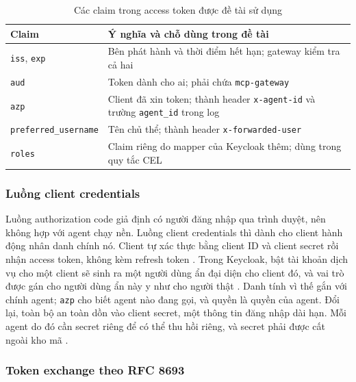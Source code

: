 \documentclass[a4paper]{article}
\begin{document}
\begin{table}[H]\centering\caption{Các claim trong access token được đề tài sử dụng}\label{tab:ch3-claims}
{\singlespacing\renewcommand{\arraystretch}{1.2}\small
\begin{tabularx}{\textwidth}{|p{3.3cm}|X|}\hline
\textbf{Claim} & \textbf{Ý nghĩa và chỗ dùng trong đề tài} \\ \hline
\texttt{iss}, \texttt{exp} & Bên phát hành và thời điểm hết hạn; gateway kiểm tra cả hai \\ \hline
\texttt{aud} & Token dành cho ai; phải chứa \texttt{mcp-gateway} \\ \hline
\texttt{azp} & Client đã xin token; thành header \texttt{x-agent-id} và trường \texttt{agent\_id} trong log \\ \hline
\texttt{preferred\_\allowbreak username} & Tên chủ thể; thành header \texttt{x-forwarded-user} \\ \hline
\texttt{roles} & Claim riêng do mapper của Keycloak thêm; dùng trong quy tắc CEL \\ \hline
\end{tabularx}}\end{table}

\subsubsection{Luồng client credentials}

Luồng authorization code giả định có người đăng nhập qua trình duyệt, nên không hợp với agent chạy nền. Luồng client credentials thì dành cho client hành động nhân danh chính nó. Client tự xác thực bằng client ID và client secret rồi nhận access token, không kèm refresh token \parencite{rfc6749}. Trong Keycloak, bật tài khoản dịch vụ cho một client sẽ sinh ra một người dùng ẩn đại diện cho client đó, và vai trò được gán cho người dùng ẩn này y như cho người thật \parencite{keycloak}. Danh tính vì thế gắn với chính agent; \texttt{azp} cho biết agent nào đang gọi, và quyền là quyền của agent. Đổi lại, toàn bộ an toàn dồn vào client secret, một thông tin đăng nhập dài hạn. Mỗi agent do đó cần secret riêng để có thể thu hồi riêng, và secret phải được cất ngoài kho mã \parencite{k8s_secret}.

\subsubsection{Token exchange theo RFC 8693}
\end{document}
